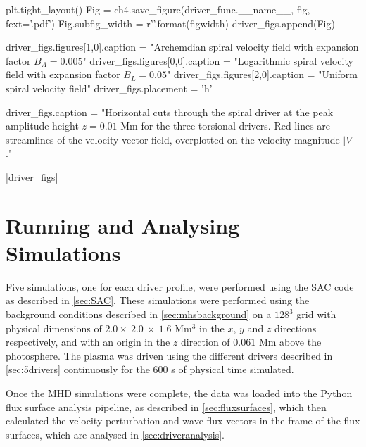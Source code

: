\begin{pycode}[chapter4]
    plt.tight_layout()
    Fig = ch4.save_figure(driver_func.__name__, fig, fext='.pdf')
    Fig.subfig_width = r'{}\columnwidth'.format(figwidth)
    driver_figs.append(Fig)

driver_figs.figures[1,0].caption = "Archemdian spiral velocity field with expansion factor $B_A=0.005$"
driver_figs.figures[0,0].caption = "Logarithmic spiral velocity field with expansion factor $B_L=0.05$"
driver_figs.figures[2,0].caption = "Uniform spiral velocity field"
driver_figs.placement = 'h'

driver_figs.caption = "Horizontal cuts through the spiral driver at the peak amplitude height $z = 0.01$ Mm for the three torsional drivers. Red lines are streamlines of the velocity vector field, overplotted on the velocity magnitude $|V|$."
\end{pycode}

\py[chapter4]|driver_figs|

\section{Running and Analysing Simulations}

Five simulations, one for each driver profile, were performed using the SAC code as described in \cref{sec:SAC}.
These simulations were performed using the background conditions described in \cref{sec:mhsbackground} on a $128^3$ grid with physical dimensions of $2.0 \times\ 2.0\ \times\ 1.6$ Mm$^3$ in the $x$, $y$ and $z$ directions respectively, and with an origin in the $z$ direction of $0.061$ Mm above the photosphere.
The plasma was driven using the different drivers described in \cref{sec:5drivers} continuously for the $600$ s of physical time simulated.

Once the MHD simulations were complete, the data was loaded into the Python flux surface analysis pipeline, as described in \cref{sec:fluxsurfaces}, which then calculated the velocity perturbation and wave flux vectors in the frame of the flux surfaces, which are analysed in \cref{sec:driveranalysis}.

